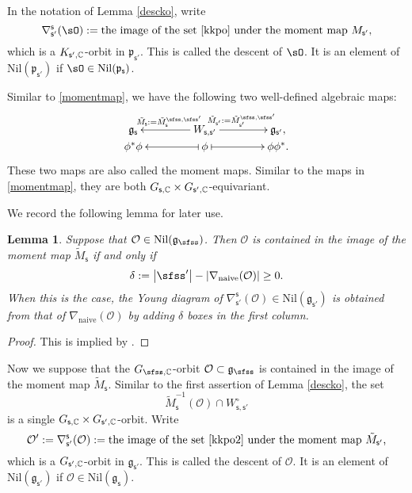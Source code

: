 \documentclass[12pt,a4paper]{amsart}
\def\abs#1{\left|{#1}\right|}
\newcommand{\CO}{{\mathcal {O}}}
\newcommand{\g}{\mathfrak g}
\newcommand{\p}{\mathfrak p}
\def\DD{\nabla}
\newcommand{\be}{\begin {equation}}
\newcommand{\ee}{\end {equation}}
\numberwithin{equation}{section}
\newtheorem{lem}[thm]{Lemma}
\theoremstyle{remark}
\begin{document}
In the notation of Lemma \ref{descko}, write
\[
  \nabla^{\mathsf s}_{\mathsf s'}(\sO):=\textrm{the image of the set \eqref{kkpo} under the moment map  $M_{\mathsf s'}$,}
\]
which is a $ K_{\mathsf s', \mathbb{C}}$-orbit in $\p_{\mathsf s'}$. This is called the descent of $\sO$. It is an element of $\mathrm{Nil}(\p_{\mathsf s'})$ if $\sO\in \mathrm{Nil}(\p_{\mathsf s})$.

Similar to \eqref{momentmap}, we have the following two well-defined algebraic maps:
   \be\label{momentmap2}
    \xymatrix@R=0em@C=4em{
      \g_\mathsf s &\ar[l]_{\tilde M_\mathsf s:=\tilde M_\mathsf s^{\sfss, \sfss'}} W_{\mathsf s, \mathsf s'}\ar[r]^{\tilde M_{\mathsf s'}:=\tilde M_{\mathsf s'}^{\sfss, \sfss'}}& \g_{\mathsf s'},\\
     \phi^* \phi & \ar@{|->}[l] \phi \ar@{|->}[r] & \phi \phi^*.
    }
  \ee
These two maps are also called the moment maps. Similar to the maps in \eqref{momentmap},   they  are both $G_{\mathsf s,\mathbb{C}}\times G_{\mathsf s', \mathbb{C}}$-equivariant.


We record the following lemma for later use. 
\begin{lem}\label{imageofmm}
Suppose that $\CO\in \mathrm{Nil}(\g_\sfss)$. Then  $\CO$ is contained in the image of the moment map $\tilde M_{\mathsf s}$ if and only if
\[
 \delta:=  \abs{\sfss'}-\abs{\DD_\mathrm{naive}(\CO)}\geq 0.
\]
When this is the case, the Young diagram of $\DD_{\mathsf s'}^{\mathsf s}(\CO)\in \mathrm{Nil}(\g_{\mathsf s'})$ is obtained from that of $\DD_\mathrm{naive}(\CO)$ by adding $\delta$ boxes in the first column.

\end{lem}
\begin{proof}
This is implied by \cite[Theorem 3.6]{DKPC}.
\end{proof}

Now we suppose that the $G_{\sfss, \C}$-orbit $\CO\subset\g_\sfss$
  is contained in the image of the moment map $\tilde M_{\mathsf s}$. Similar to
the first assertion of Lemma \ref{descko}, the set
\be\label{kkpo2}
  \tilde M_{\mathsf s}^{-1}(\CO)\cap W_{\mathsf s, \mathsf s'}^\circ
\ee
is a single $G_{\mathsf s,\mathbb{C}}\times G_{\mathsf s', \mathbb{C}}$-orbit.
Write
\[
 \CO':= \nabla^{\mathsf s}_{\mathsf s'}(\CO):=\textrm{the image of the set \eqref{kkpo2} under the moment map  $\tilde M_{\mathsf s'}$,}
\]
which is a $ G_{\mathsf s', \mathbb{C}}$-orbit in $\g_{\mathsf s'}$.
This is  called the descent of $\CO$. It is an element of  $\mathrm{Nil}(\g_{\mathsf s'})$ if $\CO\in \mathrm{Nil}(\g_{\mathsf s})$.
\end{document}

